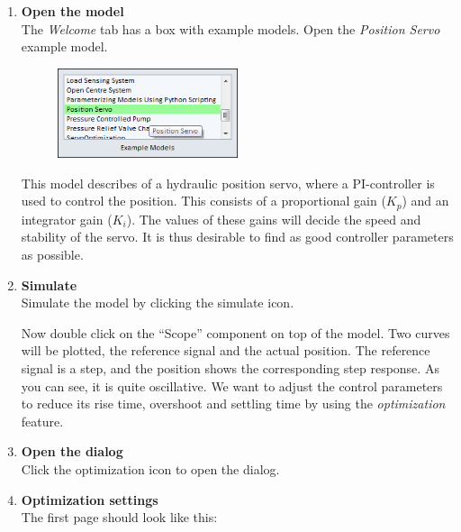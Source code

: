 \documentclass[a4paper]{article}
\begin{document}
\begin{enumerate}
\item \textbf{Open the model}\\
The \textit{Welcome} tab has a box with example models. Open the \textit{Position Servo} example model.

\FloatBarrier
\begin{figure}[h]
\center
\includegraphics[width=0.5\textwidth]{gfx/optimization/openmodel.png}
\end{figure}
\FloatBarrier

This model describes of a hydraulic position servo, where a PI-controller is used to control the position. This consists of a proportional gain ($K_{p}$) and an integrator gain ($K_{i}$).  The values of these gains will decide the speed and stability of the servo. It is thus desirable to find as good controller parameters as possible.

\item \textbf{Simulate}\\
Simulate the model by clicking the simulate icon.
 

Now double click on the ``Scope'' component on top of the model. Two curves will be plotted, the reference signal and the actual position. The reference signal is a step, and the position shows the corresponding step response. As you can see, it is quite oscillative. We want to adjust the control parameters to reduce its rise time, overshoot and settling time by using the \textit{optimization} feature.

\item \textbf{Open the dialog} \\
Click the optimization icon to open the dialog.


\pagebreak

\item \textbf{Optimization settings} \\
The first page should look like this:


\end{enumerate}
\end{document}
